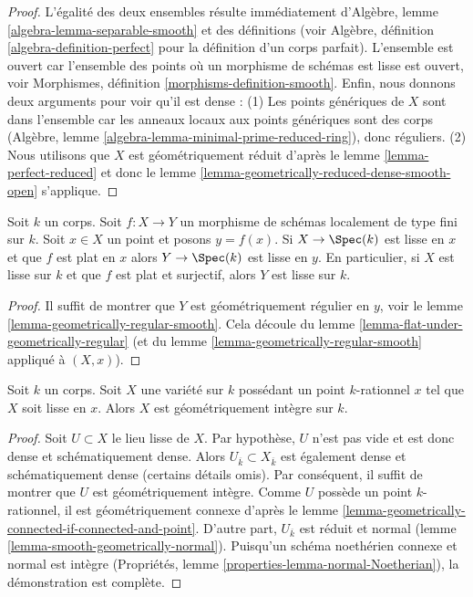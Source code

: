 \begin{proof}
 L'égalité des deux ensembles résulte immédiatement
d'Algèbre, lemme \ref{algebra-lemma-separable-smooth} et des définitions
(voir Algèbre, définition \ref{algebra-definition-perfect} pour la définition
d'un corps parfait). L'ensemble est ouvert car l'ensemble des points où
un morphisme de schémas est lisse est
ouvert, voir Morphismes, définition \ref{morphisms-definition-smooth}.
Enfin, nous donnons deux arguments pour voir qu'il est dense :
(1) Les points génériques de $X$ sont dans l'ensemble car les anneaux locaux
aux points génériques sont des corps (Algèbre, lemme 
\ref{algebra-lemma-minimal-prime-reduced-ring}), donc réguliers. (2)
Nous utilisons que $X$ est géométriquement réduit d'après le
lemme \ref{lemma-perfect-reduced} et donc
le lemme \ref{lemma-geometrically-reduced-dense-smooth-open} s'applique. 
\end{proof}

\begin{lemma}
\label{lemma-flat-under-smooth}
 Soit $k$ un corps. Soit $f : X \to Y$ un morphisme de schémas localement
de type fini sur $k$. Soit $x \in X$ un point et posons $y = f(x)$.
Si $X \to \Spec(k)$ est lisse en $x$ et que $f$ est plat en $x$
 alors $Y \to \Spec(k)$ est lisse en $y$. En particulier, si $X$
 est lisse sur $k$ et que $f$ est plat et surjectif, alors $Y$ est lisse sur $k$. 
\end{lemma}

\begin{proof}
 Il suffit de montrer que $Y$ est géométriquement régulier en $y$, voir
le lemme \ref{lemma-geometrically-regular-smooth}.
Cela découle du
lemme \ref{lemma-flat-under-geometrically-regular}
 (et
du lemme \ref{lemma-geometrically-regular-smooth}
 appliqué à $(X, x)$). 
\end{proof}

\begin{lemma}
\label{lemma-variety-with-smooth-rational-point}
 Soit $k$ un corps. Soit $X$ une variété sur $k$ possédant un point 
$k$-rationnel $x$ tel que $X$ soit lisse en $x$.
Alors $X$ est géométriquement intègre sur $k$. 
\end{lemma}

\begin{proof}
 Soit $U \subset X$ le lieu lisse de $X$. Par hypothèse, $U$ n'est pas
vide et est donc dense et schématiquement dense. Alors 
$U_{\overline{k}} \subset X_{\overline{k}}$ est également
dense et schématiquement dense (certains détails omis). Par conséquent,
il suffit de montrer que $U$ est géométriquement intègre.
Comme $U$ possède un point $k$-rationnel, il est géométriquement connexe d'après le
lemme \ref{lemma-geometrically-connected-if-connected-and-point}.
D'autre part, $U_{\overline{k}}$ est réduit et normal
(lemme \ref{lemma-smooth-geometrically-normal}).
Puisqu'un schéma noethérien connexe et
normal est intègre (Propriétés, lemme \ref{properties-lemma-normal-Noetherian}),
la démonstration est complète. 
\end{proof}

